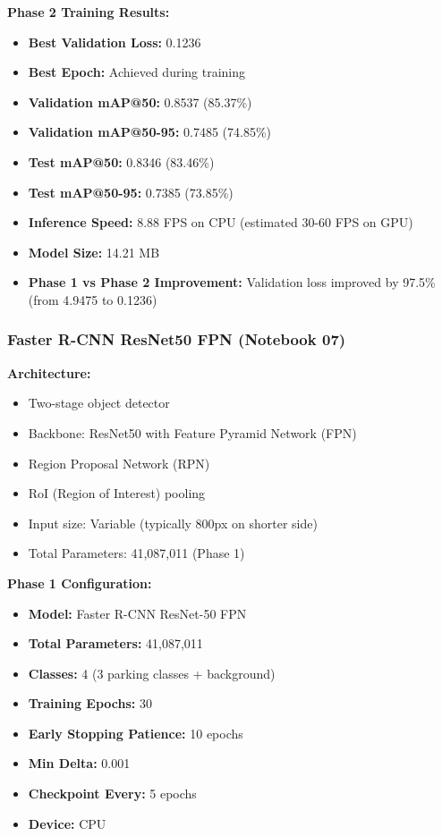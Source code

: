 \documentclass[12pt,a4paper]{article}
\begin{document}
\textbf{Phase 2 Training Results:}
\begin{itemize}
    \item \textbf{Best Validation Loss:} 0.1236
    \item \textbf{Best Epoch:} Achieved during training
    \item \textbf{Validation mAP@50:} 0.8537 (85.37\%)
    \item \textbf{Validation mAP@50-95:} 0.7485 (74.85\%)
    \item \textbf{Test mAP@50:} 0.8346 (83.46\%)
    \item \textbf{Test mAP@50-95:} 0.7385 (73.85\%)
    \item \textbf{Inference Speed:} 8.88 FPS on CPU (estimated 30-60 FPS on GPU)
    \item \textbf{Model Size:} 14.21 MB
    \item \textbf{Phase 1 vs Phase 2 Improvement:} Validation loss improved by 97.5\% (from 4.9475 to 0.1236)
\end{itemize}

\subsubsection{Faster R-CNN ResNet50 FPN (Notebook 07)}

\textbf{Architecture:}
\begin{itemize}
    \item Two-stage object detector
    \item Backbone: ResNet50 with Feature Pyramid Network (FPN)
    \item Region Proposal Network (RPN)
    \item RoI (Region of Interest) pooling
    \item Input size: Variable (typically 800px on shorter side)
    \item Total Parameters: 41,087,011 (Phase 1)
\end{itemize}

\textbf{Phase 1 Configuration:}
\begin{itemize}
    \item \textbf{Model:} Faster R-CNN ResNet-50 FPN
    \item \textbf{Total Parameters:} 41,087,011
    \item \textbf{Classes:} 4 (3 parking classes + background)
    \item \textbf{Training Epochs:} 30
    \item \textbf{Early Stopping Patience:} 10 epochs
    \item \textbf{Min Delta:} 0.001
    \item \textbf{Checkpoint Every:} 5 epochs
    \item \textbf{Device:} CPU
\end{itemize}
\end{document}
